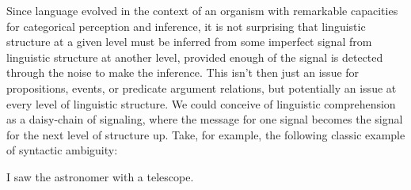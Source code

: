 \documentclass[12pt]{article}
\begin{document}

 
Since language evolved in the context of an organism with remarkable capacities for categorical perception and inference, it is not surprising that linguistic structure at a given level must be inferred from some imperfect signal from linguistic structure at another level, provided enough of the signal is detected through the noise to make the inference. This isn't then just an issue for propositions, events, or predicate argument relations, but potentially an issue at every level of linguistic structure. We could conceive of linguistic comprehension as a daisy-chain of signaling, where the message for one signal becomes the signal for the next level of structure up. Take, for example, the following classic example of syntactic ambiguity:

\begin{exe}
	\ex I saw the astronomer with a telescope.
\end{exe}
\end{document}
